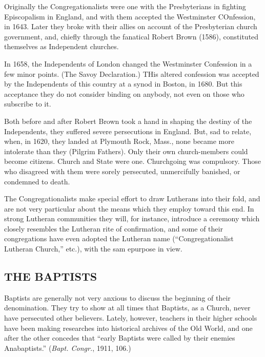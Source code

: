 \documentclass[
]{book}
\begin{document}
Originally the Congregationalists were one with the Presbyterians in fighting Episcopalism in England, and with them accepted the Westminster COnfession, in 1643. Later they broke with their allies on account of the Presbyterian church government, and, chiefly through the fanatical Robert Brown (1586), constituted themselves as Independent churches.

In 1658, the Independents of London changed the Westminster Confession in a few minor points. (The Savoy Declaration.) THis altered confession was accepted by the Independents of this country at a synod in Boston, in 1680. But this acceptance they do not consider binding on anybody, not even on those who subscribe to it.

Both before and after Robert Brown took a hand in shaping the destiny of the Independents, they suffered severe persecutions in England. But, sad to relate, when, in 1620, they landed at Plymouth Rock, Mass., none became more intolerate than they (Pilgrim Fathers). Only their own church-members could become citizens. Church and State were one. Churchgoing was compulsory. Those who disagreed with them were sorely persecuted, unmercifully banished, or condemned to death.

The Congregationalists make special effort to draw Lutherans into their fold, and are not very particular about the means which they employ toward this end. In strong Lutheran communities they will, for instance, introduce a ceremony which closely resembles the Lutheran rite of confirmation, and some of their congregations have even adopted the Lutheran name (``Congregationalist Lutheran Church,'' etc.), with the sam epurpose in view.

\subsection{THE BAPTISTS}\label{the-baptists}

Baptists are generally not very anxious to discuss the beginning of their denomination. They try to show at all times that Baptists, as a Church, never have persecuted other believers. Lately, however, teachers in their higher schools have been making researches into historical archives of the Old World, and one after the other concedes that ``early Baptists were called by their enemies Anabaptists.'' (\emph{Bapt. Congr.}, 1911, 106.)
\end{document}
